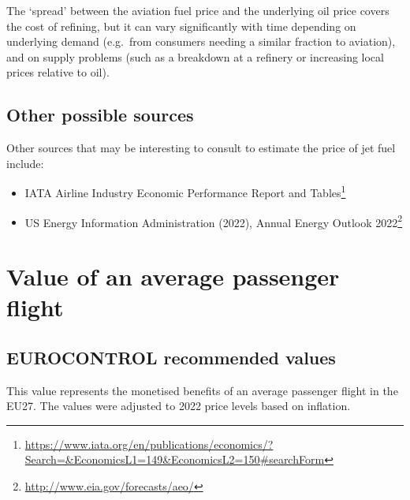 \documentclass[
  11pt,
  a4paper,
]{book}
\DeclareRobustCommand{\href}[2]{#2\footnote{\url{#1}}}
\begin{document}
The `spread' between the aviation fuel price and the underlying oil
price covers the cost of refining, but it can vary significantly with
time depending on underlying demand (e.g.~from consumers needing a
similar fraction to aviation), and on supply problems (such as a
breakdown at a refinery or increasing local prices relative to oil).

\hypertarget{other-possible-sources}{%
\section{Other possible sources}\label{other-possible-sources}}

Other sources that may be interesting to consult to estimate the price
of jet fuel include:

\begin{itemize}
\item
  \href{https://www.iata.org/en/publications/economics/?Search=\&EconomicsL1=149\&EconomicsL2=150\#searchForm}{IATA
  Airline Industry Economic Performance Report and Tables}
\item
  \href{http://www.eia.gov/forecasts/aeo/}{US Energy Information
  Administration (2022), Annual Energy Outlook 2022}
\end{itemize}

\hypertarget{sec-value-of-an-average-passenger-flight}{%
\chapter{Value of an average passenger
flight}\label{sec-value-of-an-average-passenger-flight}}

\hypertarget{eurocontrol-recommended-values-9}{%
\section{EUROCONTROL recommended
values}\label{eurocontrol-recommended-values-9}}

This value represents the monetised benefits of an average passenger
flight in the EU27. The values were adjusted to 2022 price levels based
on inflation.
\end{document}
